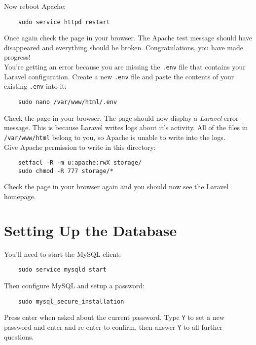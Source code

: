 Now reboot Apache:

\begin{verbatim}
    sudo service httpd restart
\end{verbatim}

Once again check the page in your browser. The Apache test message should have disappeared and everything should be broken. Congratulations, you have made progress!
\\

You're getting an error because you are missing the \texttt{.env} file that contains your Laravel configuration. Create a new \texttt{.env} file and paste the contents of your existing \texttt{.env} into it:

\begin{verbatim}
    sudo nano /var/www/html/.env
\end{verbatim}


Check the page in your browser. The page should now display a \textit{Laravel} error message. This is because Laravel writes logs about it's activity. All of the files in \texttt{/var/www/html} belong to you, so Apache is unable to write into the logs.
\\

Give Apache permission to write in this directory:

\begin{verbatim}
    setfacl -R -m u:apache:rwX storage/
    sudo chmod -R 777 storage/*
\end{verbatim}

Check the page in your browser again and you should now see the Laravel homepage.


\section{Setting Up the Database}

You'll need to start the MySQL client:

\begin{verbatim}
    sudo service mysqld start
\end{verbatim}

Then configure MySQL and setup a password:

\begin{verbatim}
    sudo mysql_secure_installation
\end{verbatim}

Press enter when asked about the current password. Type \texttt{Y} to set a new password and enter and re-enter to confirm, then answer \texttt{Y} to all further questions.

